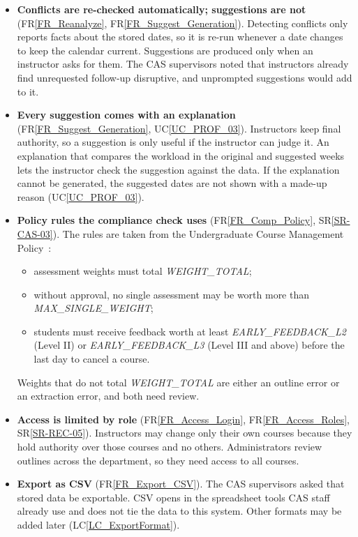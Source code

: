 \documentclass[12pt]{article}
\newcommand{\srref}[1]{SR\ref{#1}}
\newcommand{\ucref}[1]{UC\ref{#1}}
\newcommand{\rref}[1]{FR\ref{#1}}
\newcommand{\lcref}[1]{LC\ref{#1}}
\begin{document}
\begin{itemize}
\item \textbf{Conflicts are re-checked automatically; suggestions are not}
  (\rref{FR_Reanalyze}, \rref{FR_Suggest_Generation}). Detecting conflicts only
  reports facts about the stored dates, so it is re-run whenever a date changes
  to keep the calendar current. Suggestions are produced only when an
  instructor asks for them. The CAS supervisors noted that instructors already
  find unrequested follow-up disruptive, and unprompted suggestions would add to
  it.

\item \textbf{Every suggestion comes with an explanation}
  (\rref{FR_Suggest_Generation}, \ucref{UC_PROF_03}). Instructors keep final
  authority, so a suggestion is only useful if the instructor can judge it. An
  explanation that compares the workload in the original and suggested weeks
  lets the instructor check the suggestion against the data. If the
  explanation cannot be generated, the suggested dates are not shown with a
  made-up reason (\ucref{UC_PROF_03}).

\item \textbf{Policy rules the compliance check uses} (\rref{FR_Comp_Policy},
  \srref{SR-CAS-03}). The rules are taken from the Undergraduate Course
  Management Policy~\citep{McMasterUCMP2025}:
  \begin{itemize}
  \item assessment weights must total \textit{WEIGHT\_\allowbreak{}TOTAL};
  \item without approval, no single assessment may be worth more than
    \textit{MAX\_\allowbreak{}SINGLE\_\allowbreak{}WEIGHT};
  \item students must receive feedback worth at least
    \textit{EARLY\_\allowbreak{}FEEDBACK\_\allowbreak{}L2} (Level II) or
    \textit{EARLY\_\allowbreak{}FEEDBACK\_\allowbreak{}L3} (Level III and
    above) before the last day to cancel a course.
  \end{itemize} Weights that do not total
  \textit{WEIGHT\_\allowbreak{}TOTAL} are either an outline error or an
  extraction error, and both need review.

\item \textbf{Access is limited by role} (\rref{FR_Access_Login},
  \rref{FR_Access_Roles}, \srref{SR-REC-05}). Instructors may change only their
  own courses because they hold authority over those courses and no others.
  Administrators review outlines across the department, so they need access to
  all courses.

\item \textbf{Export as CSV} (\rref{FR_Export_CSV}). The CAS supervisors asked
  that stored data be exportable. CSV opens in the spreadsheet tools CAS staff
  already use and does not tie the data to this system. Other formats may be
  added later (\lcref{LC_ExportFormat}).
\end{itemize}
\end{document}
